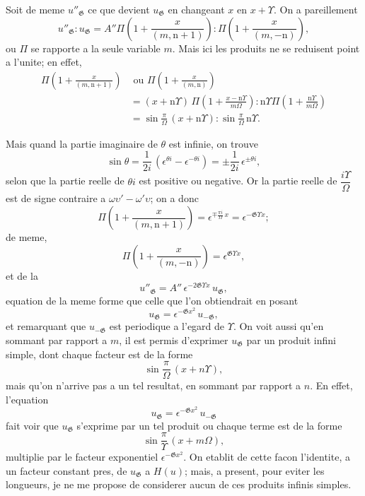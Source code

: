 \documentclass[11pt,a4paper]{article}
\begin{document}
Soit de meme $u''_{\mathfrak{G}}$ ce que devient $u_{\mathfrak{G}}$ en changeant $x$ en $x + \Upsilon$. On a pareillement
\[u''_{\mathfrak{G}} : u_{\mathfrak{G}} = A''\Pi\left(1 + \frac{x}{(m, \mathrm{n}+1)}\right) : \Pi\left(1 + \frac{x}{(m, -\mathrm{n})}\right),\]
ou $\Pi$ se rapporte a la seule variable $m$. Mais ici les produits ne se reduisent point
a l'unite; en effet,
\begin{align*}
\Pi\left(1 + \frac{x}{(m, \mathrm{n}+1)}\right) &\text{ ou } \Pi\left(1 + \frac{x}{(m, \mathrm{n})}\right)\\
&= (x + \mathrm{n}\Upsilon)\, \Pi\left(1 + \frac{x - \mathrm{n}\Upsilon}{m\Omega}\right) : \mathrm{n}\Upsilon\Pi\left(1 + \frac{\mathrm{n}\Upsilon}{m\Omega}\right)\\
&= \sin\frac{\pi}{\Omega}\, (x + \mathrm{n}\Upsilon) : \sin\frac{\pi}{\Omega}\, \mathrm{n}\Upsilon.
\end{align*}

Mais quand la partie imaginaire de $\theta$ est infinie, on trouve
\[\sin\theta = \frac{1}{2i}\, (\epsilon^{\theta i} - \epsilon^{-\theta i}) = \pm \frac{1}{2i}\, \epsilon^{\pm\theta i},\]
selon que la partie reelle de $\theta i$ est positive ou negative. Or la partie reelle de $\dfrac{i\Upsilon}{\Omega}$
est de signe contraire a $\omega\upsilon' - \omega'\upsilon$; on a donc
\[\Pi\left(1 + \frac{x}{(m, \mathrm{n}+1)}\right) = \epsilon^{\mp \frac{\pi i}{\Omega}\, x} = \epsilon^{-\mathfrak{G}\Upsilon x};\]
de meme,
\[\Pi\left(1 + \frac{x}{(m, -\mathrm{n})}\right) = \epsilon^{\mathfrak{G}\Upsilon x},\]
et de la
\begin{equation}
u''_{\mathfrak{G}} = A''\, \epsilon^{-2\mathfrak{G}\Upsilon x}\, u_{\mathfrak{G}}, \tag{19}
\end{equation}
equation de la meme forme que celle que l'on obtiendrait en posant
\[u_{\mathfrak{G}} = \epsilon^{-\mathfrak{G}x^2}\, u_{-\mathfrak{G}},\]
et remarquant que $u_{-\mathfrak{G}}$ est periodique a l'egard de $\Upsilon$. On voit aussi qu'en sommant
par rapport a $m$, il est permis d'exprimer $u_{\mathfrak{G}}$ par un produit infini simple, dont chaque
facteur est de la forme
\[\sin\frac{\pi}{\Omega}\, (x + n\Upsilon),\]
mais qu'on n'arrive pas a un tel resultat, en sommant par rapport a $n$. En effet,
l'equation
\[u_{\mathfrak{G}} = \epsilon^{-\mathfrak{G}x^2}\, u_{-\mathfrak{G}}\]
fait voir que $u_{\mathfrak{G}}$ s'exprime par un tel produit ou chaque terme est de la forme
\[\sin\frac{\pi}{\Upsilon}\, (x + m\Omega),\]
multiplie par le facteur exponentiel $\epsilon^{-\mathfrak{G}x^2}$. On etablit de cette facon l'identite, a un
facteur constant pres, de $u_{\mathfrak{G}}$ a $H(u)$; mais, a present, pour eviter les longueurs, je
ne me propose de considerer aucun de ces produits infinis simples.
\end{document}
